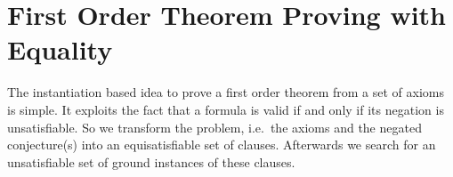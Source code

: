 
\chapter{First Order Theorem Proving with Equality}



The instantiation based idea to prove a first order theorem from a set of axioms is simple. 
It exploits the fact that a formula is valid if and only if its negation is unsatisfiable.
So we transform the problem, i.e.~the axioms and the negated conjecture(s) into an equisatisfiable set of clauses.
Afterwards we search for an unsatisfiable set of ground instances of these clauses.

